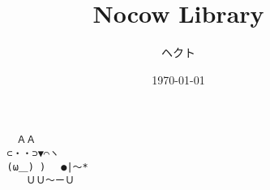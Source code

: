 \documentclass[9pt,onecolumn,a4paper,landscape]{extarticle}
\title{Nocow Library}
\author{ヘクト}
\date{\today}
\begin{document}
\maketitle

\begin{center}
\begin{minipage}{4cm}
	\begin{verbatim}
	　　ＡＡ
	　⊂・・⊃▼⌒ヽ
	　(ω＿) )　 ●|〜*
	　　　ＵＵ〜ーＵ
	\end{verbatim}
\end{minipage}
\end{center}


\tableofcontents


\end{document}
